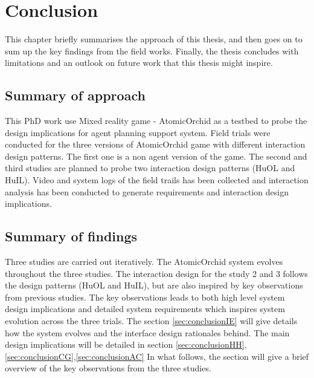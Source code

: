 \chapter{Conclusion}

This chapter briefly summarises the approach of this thesis, and then goes on to sum up the key findings from the field works. Finally, the thesis concludes with limitations and an outlook on future work that this thesis might inspire.\\

\section{Summary of approach}
This PhD work use Mixed reality game - AtomicOrchid as a testbed to probe the design implications for agent planning support system. Field trials were conducted for the three versions of AtomicOrchid game with different interaction design patterns. The first one is a non agent version of the game. The second and third studies are planned to probe two interaction design patterns (HuOL and HuIL). Video and system logs of the field trails has been collected and interaction analysis has been conducted to generate requirements and interaction design implications. \\


\section{Summary of findings}
Three studies are carried out iteratively. The AtomicOrchid system evolves throughout the three studies. The interaction design for the study 2 and 3 follows the design patterns (HuOL and HuIL), but are also inspired by key observations from previous studies. The key observations leads to both high level system design implications and detailed system requirements which inspires system evolution across the three trials.  The section \ref{sec:conclusionIE}  will give details how the system evolves and the interface design rationales behind. The main design implications will be detailed in section \ref{sec:conclusionHH},\ref{sec:conclusionCG},\ref{sec:conclusionAC}  In what follows, the section will give a brief overview of the key observations from the three studies.\\ 


